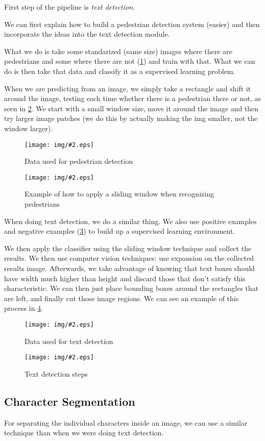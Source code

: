 \documentclass[10pt]{extarticle}
\newcommand{\stdfig}[3]{
    \begin{figure}
    \centering
    \texttt{[image: img/\#2.eps]}
    \caption{#3}
    \label{fig:#2}
    \end{figure}
}
\begin{document}
First step of the pipeline is \emph{text detection}. \smallskip

We can first explain how to build a pedestrian detection system (easier)
and then incorporate the ideas into the text detection module.

What we do is take some standarized (same size) images where there are
pedestrians and some where there are not
(\cref{fig:pedestrian_detection_training_data}) and train with that.
What we can do is then take that data and classify it as a supervised
learning problem.

When we are predicting from an image, we simply take a rectangle and
shift it around the image, testing each time whether there is a
pedestrian there or not, as seen in
\cref{fig:pedestrian_sliding_window}. We start with a small window size,
move it around the image and then try larger image patches (we do this
by actually making the img smaller, not the window larger). \smallskip

\stdfig{12cm}{pedestrian_detection_training_data}{Data used for pedestrian detection}

\stdfig{10cm}{pedestrian_sliding_window}{Example of how to apply a sliding window when recognizing pedestrians}

When doing text detection, we do a similar thing. We also use positive
examples and negative examples (\cref{fig:text_detection_training_data})
to build up a supervised learning environment.

We then apply the classifier using the sliding window technique and
collect the results. We then use computer vision techniques: use
expansion on the collected results image. Afterwards, we take advantage
of knowing that text boxes should have width much higher than height and
discard those that don't satisfy this characteristic. We can then just
place bounding boxes around the rectangles that are left, and finally
cut those image regions. We can see an example of this process in
\cref{fig:text_detection_visual_algorithm}.

\stdfig{12cm}{text_detection_training_data}{Data used for text detection}

\stdfig{12cm}{text_detection_visual_algorithm}{Text detection steps}

\subsection{Character Segmentation}\label{character-segmentation}

For separating the individual characters inside an image, we can use a
similar technique than when we were doing text detection.
\end{document}

